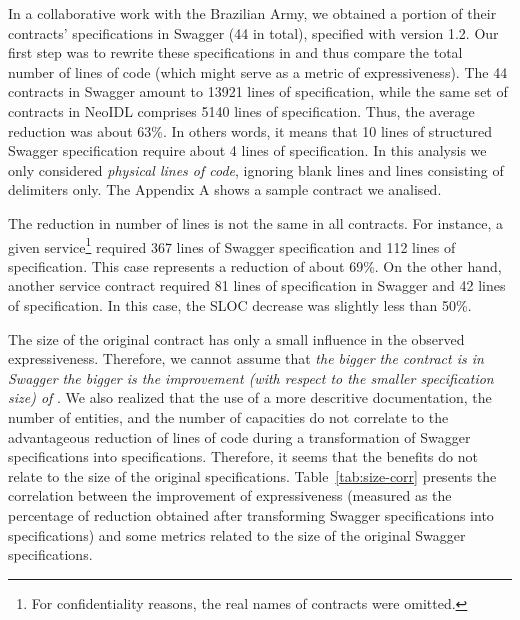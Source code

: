 In a collaborative work with the Brazilian Army,
we obtained a portion of their contracts' specifications in Swagger (44 in total), specified with version 1.2.
Our first step was to rewrite these specifications in \neoidl{} and thus compare the total
number of lines of code (which might serve as a metric of expressiveness).
The 44 contracts in Swagger amount to 13921 lines of specification, while the same set of contracts in NeoIDL comprises 5140 lines of specification. Thus, the average reduction was about 63\%. In others words, it means that 10 lines of structured Swagger specification require
about 4 lines of \neoidl{} specification. In this analysis we only considered \emph{physical lines of code}, ignoring 
blank lines and lines consisting of delimiters only. The Appendix A shows a sample contract we analised.

The reduction in number of lines is not the same in all contracts. For instance, a given service\footnote{For confidentiality reasons, the real names of contracts were omitted.} required 367 lines of Swagger specification and 112 lines of \neoidl{} specification. This case  
represents a reduction of about 69\%. On the other hand, another service contract required 
81 lines of specification in Swagger and 42 lines of \neoidl{} specification. In this case, the SLOC decrease was slightly less than 50\%.

The size of the original contract has only a small influence in the observed expressiveness. 
Therefore, we cannot assume that \emph{the bigger the contract is in Swagger 
the bigger is the improvement (with respect to the smaller specification size) of \neoidl}. We 
also realized that the use of a more descritive documentation, the number of entities, and the number of capacities do not correlate to the advantageous reduction of lines of code during a 
transformation of Swagger specifications into \neoidl{} specifications. Therefore, it seems that 
the benefits do not relate to the size of the original specifications.  
Table~\ref{tab:size-corr} presents the correlation between the improvement of 
expressiveness (measured as the percentage of reduction obtained 
after transforming Swagger specifications into \neoidl{} specifications) and 
some metrics related to the size of the original Swagger specifications.


